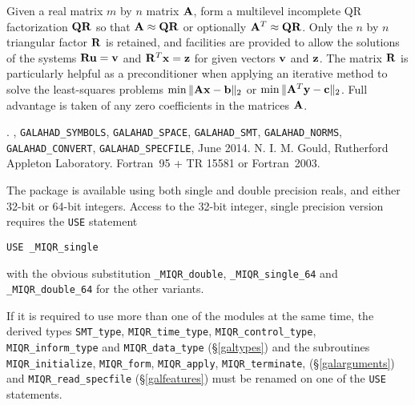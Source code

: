 \documentclass{galahad}
\newcommand{\packagename}{MIQR}
\newcommand{\fullpackagename}{\libraryname\_\packagename}
\begin{document}
\galheader


\galsummary
Given a real matrix $m$ by $n$ matrix ${\mathbf{A}}$, form a multilevel 
incomplete QR factorization ${\mathbf{Q}} {\mathbf{R}}$ so that ${\mathbf{A}} \approx {\mathbf{Q}}{\mathbf{R}}$ or
optionally ${\mathbf{A}}^T \approx {\mathbf{Q}}{\mathbf{R}}$.
Only the $n$ by $n$ triangular factor ${\mathbf{R}}$ is retained, and facilities
are provided to allow the solutions of the systems ${\mathbf{R}} {\mathbf{u}} = {\mathbf{v}}$ and 
${\mathbf{R}}^T {\mathbf{x}} = {\mathbf{z}}$
for given vectors ${\mathbf{v}}$ and ${\mathbf{z}}$. The matrix ${\mathbf{R}}$ is particularly helpful
as a preconditioner when applying an iterative method to solve the
least-squares problems $\min \|{\mathbf{A}}{\mathbf{x}}-{\mathbf{b}}\|_2$ or 
$\min \|{\mathbf{A}}^T{\mathbf{y}}-{\mathbf{c}}\|_2$.
Full advantage is taken of any zero coefficients in the matrices ${\mathbf{A}}$.


\galattributes
\galversions{\tt  \fullpackagename\_single, \fullpackagename\_double}.
,
{\tt GALAHAD\_\-SY\-M\-BOLS}, 
{\tt GALAHAD\-\_SPACE}, 
{\tt GALAHAD\_SMT},
{\tt GALAHAD\_NORMS},
{\tt GALAHAD\_CONVERT},
{\tt GALAHAD\_SPECFILE},
\galdate June 2014.
\galorigin N. I. M. Gould,
Rutherford Appleton Laboratory.
\gallanguage Fortran~95 + TR 15581 or Fortran~2003. 


\galhowto

The package is available using both single and double precision reals, 
and either 32-bit or 64-bit integers. Access to the 32-bit integer,
single precision version requires the {\tt USE} statement
\medskip

\hspace{8mm} {\tt USE \fullpackagename\_single}

\medskip
\noindent
with the obvious substitution {\tt \fullpackagename\_double},
{\tt \fullpackagename\_single\_64} and 
{\tt \fullpackagename\_double\_64} for the other variants.

\noindent
If it is required to use more than one of the modules at the same time, 
the derived types
{\tt SMT\_type}, 
{\tt \packagename\_time\_type}, 
{\tt \packagename\_control\_type}, 
{\tt \packagename\_inform\_type} 
and
{\tt \packagename\_data\_type}
(\S\ref{galtypes})
and the subroutines
{\tt \packagename\_initialize}, 
{\tt \packagename\_\-form},
{\tt \packagename\_\-apply},
{\tt \packagename\_terminate},
(\S\ref{galarguments})
and 
{\tt \packagename\_read\_specfile}
(\S\ref{galfeatures})
must be renamed on one of the {\tt USE} statements.
\end{document}
